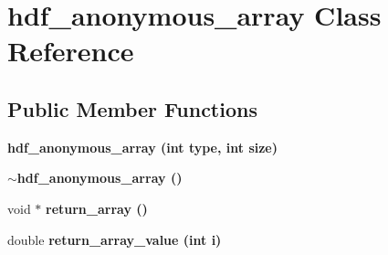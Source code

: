 \section{hdf\_\-anonymous\_\-array Class Reference}
\label{classhdf__anonymous__array}
\subsection*{Public Member Functions}
\begin{CompactItemize}
\item 
\bf{hdf\_\-anonymous\_\-array} (int type, int size)\label{classhdf__anonymous__array_d73ffb789355f9ac9cf69c3b34064fcf}

\item 
\bf{$\sim$hdf\_\-anonymous\_\-array} ()\label{classhdf__anonymous__array_86e769474753c8684133da313f15d7ea}

\item 
void $\ast$ \bf{return\_\-array} ()\label{classhdf__anonymous__array_318af30ec30b76d236da747d9ea27837}

\item 
double \bf{return\_\-array\_\-value} (int i)\label{classhdf__anonymous__array_7dc7b7e16e4e209aadfa0e516ee09728}

\end{CompactItemize}
